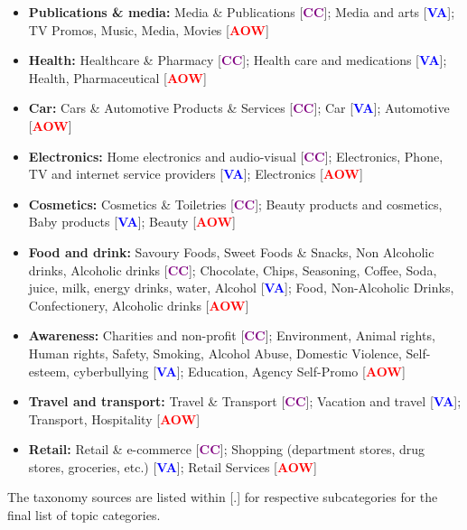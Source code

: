 \begin{itemize}
    \item \textbf{Publications \& media:} Media \& Publications  [\textcolor{purple}{\textbf{CC}}]; Media and arts [\textcolor{blue}{\textbf{VA}}]; TV Promos, Music, Media, Movies [\textcolor{red}{\textbf{AOW}}]
    \item \textbf{Health:} Healthcare \& Pharmacy [\textcolor{purple}{\textbf{CC}}]; Health care and medications [\textcolor{blue}{\textbf{VA}}]; Health, Pharmaceutical [\textcolor{red}{\textbf{AOW}}]
    \item \textbf{Car:} Cars \& Automotive Products \& Services [\textcolor{purple}{\textbf{CC}}]; Car [\textcolor{blue}{\textbf{VA}}]; Automotive [\textcolor{red}{\textbf{AOW}}]
    \item \textbf{Electronics:} Home electronics and audio-visual [\textcolor{purple}{\textbf{CC}}]; Electronics, Phone, TV and internet service providers [\textcolor{blue}{\textbf{VA}}]; Electronics [\textcolor{red}{\textbf{AOW}}]
    \item \textbf{Cosmetics:} Cosmetics \& Toiletries [\textcolor{purple}{\textbf{CC}}]; Beauty products and cosmetics, Baby products [\textcolor{blue}{\textbf{VA}}]; Beauty [\textcolor{red}{\textbf{AOW}}]
    \item \textbf{Food and drink:} Savoury Foods, Sweet Foods \& Snacks, Non Alcoholic drinks, Alcoholic drinks [\textcolor{purple}{\textbf{CC}}]; Chocolate, Chips, Seasoning, Coffee, Soda, juice, milk, energy drinks, water, Alcohol [\textcolor{blue}{\textbf{VA}}]; Food, Non-Alcoholic Drinks, Confectionery, Alcoholic drinks [\textcolor{red}{\textbf{AOW}}]
    \item \textbf{Awareness:} Charities and non-profit [\textcolor{purple}{\textbf{CC}}]; Environment, Animal rights, Human rights, Safety, Smoking, Alcohol Abuse, Domestic Violence, Self-esteem, cyberbullying [\textcolor{blue}{\textbf{VA}}]; Education, Agency Self-Promo [\textcolor{red}{\textbf{AOW}}]
    \item \textbf{Travel and transport:} Travel \& Transport [\textcolor{purple}{\textbf{CC}}]; Vacation and travel [\textcolor{blue}{\textbf{VA}}]; Transport, Hospitality [\textcolor{red}{\textbf{AOW}}]
    \item \textbf{Retail:} Retail \& e-commerce [\textcolor{purple}{\textbf{CC}}]; Shopping (department stores, drug stores, groceries, etc.) [\textcolor{blue}{\textbf{VA}}]; Retail Services [\textcolor{red}{\textbf{AOW}}]
\end{itemize}
The taxonomy sources are listed within [.] for respective subcategories for the final list of topic categories. 


